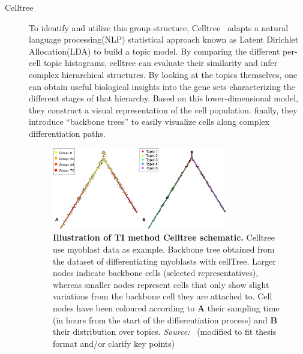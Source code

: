 \begin{description}
  \item[Celltree]
  To identify and utilize this group structure, Celltree~\citep{duverle2016celltree} adapts a natural language processing(NLP) statistical approach known as Latent Dirichlet Allocation(LDA) to build a topic model. By comparing the different per-cell topic histograms, celltree can evaluate their similarity and infer complex hierarchical structures. By looking at the topics themselves, one can obtain useful biological insights into the gene sets characterizing the different stages of that hierarchy. Based on this lower-dimensional model, they construct a visual representation of the cell population. finally, they introduce “backbone trees” to easily visualize cells along complex differentiation paths.
  \begin{figure}[ht!]
  	\centering
  	\includegraphics[width=0.75\textwidth]{TI_Alg_celltree/fig}
  	\vspace{0.1cm}
  	\caption[Illustration of TI method Celltree schematic.]{\textbf{Illustration of TI method Celltree schematic.} Celltree use myoblast data as example. Backbone tree obtained from the dataset of differentiating myoblasts with cellTree. Larger nodes indicate backbone cells (selected representatives), whereas smaller nodes represent cells that only show slight variations from the backbone cell they are attached to. Cell nodes have been coloured according to \textbf{A} their sampling time (in hours from the start of the differentiation process) and \textbf{B} their distribution over topics. \emph{Source:~\cite{duverle2016celltree}} (modified to fit thesis format and/or clarify key points)
  	}
  	\label{fig:TI_Alg_celltree}
  \end{figure}


\end{description}
